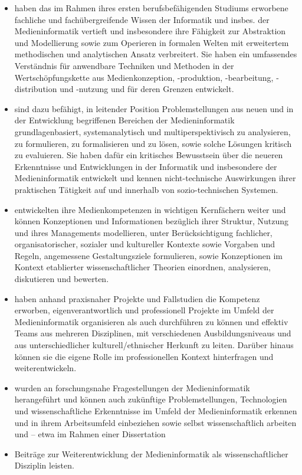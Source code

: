 \begin{itemize}
\item
  haben das im Rahmen ihres ersten berufsbefähigenden Studiums erworbene
  fachliche und fachübergreifende Wissen der Informatik und insbes. der
  Medieninformatik vertieft und insbesondere ihre Fähigkeit zur
  Abstraktion und Modellierung sowie zum Operieren in formalen Welten
  mit erweitertem methodischen und analytischen Ansatz verbreitert. Sie
  haben ein umfassendes Verständnis für anwendbare Techniken und
  Methoden in der Wertschöpfungskette aus Medienkonzeption, -produktion,
  -bearbeitung, -distribution und -nutzung und für deren Grenzen
  entwickelt.
\item
  sind dazu befähigt, in leitender Position Problemstellungen aus neuen
  und in der Entwicklung begriffenen Bereichen der Medieninformatik
  grundlagenbasiert, systemanalytisch und multiperspektivisch zu
  analysieren, zu formulieren, zu formalisieren und zu lösen, sowie
  solche Lösungen kritisch zu evaluieren. Sie haben dafür ein kritisches
  Bewusstsein über die neueren Erkenntnisse und Entwicklungen in der
  Informatik und insbesondere der Medieninformatik entwickelt und kennen
  nicht-technische Auswirkungen ihrer praktischen Tätigkeit auf und
  innerhalb von sozio-technischen Systemen.
\item
  entwickelten ihre Medienkompetenzen in wichtigen Kernfächern weiter
  und können Konzeptionen und Informationen bezüglich ihrer Struktur,
  Nutzung und ihres Managements modellieren, unter Berücksichtigung
  fachlicher, organisatorischer, sozialer und kultureller Kontexte sowie
  Vorgaben und Regeln, angemessene Gestaltungsziele formulieren, sowie
  Konzeptionen im Kontext etablierter wissenschaftlicher Theorien
  einordnen, analysieren, diskutieren und bewerten.
\item
  haben anhand praxisnaher Projekte und Fallstudien die Kompetenz
  erworben, eigenverantwortlich und professionell Projekte im Umfeld der
  Medieninformatik organisieren als auch durchführen zu können und
  effektiv Teams aus mehreren Disziplinen, mit verschiedenen
  Ausbildungsniveaus und aus unterschiedlicher kulturell/ethnischer
  Herkunft zu leiten. Darüber hinaus können sie die eigene Rolle im
  professionellen Kontext hinterfragen und weiterentwickeln.
\item
  wurden an forschungsnahe Fragestellungen der Medieninformatik
  herangeführt und können auch zukünftige Problemstellungen,
  Technologien und wissenschaftliche Erkenntnisse im Umfeld der
  Medieninformatik erkennen und in ihrem Arbeitsumfeld einbeziehen sowie
  selbst wissenschaftlich arbeiten und -- etwa im Rahmen einer
  Dissertation
\item
  Beiträge zur Weiterentwicklung der Medieninformatik als
  wissenschaftlicher Disziplin leisten.
\end{itemize}

